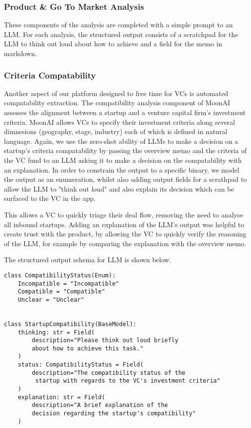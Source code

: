\documentclass[a4paper, oneside]{discothesis}
\begin{document}
\subsubsection{Product \& Go To Market Analysis}
These components of the analysis are completed with a simple prompt to an LLM. For each analysis, the structured output consists of a scratchpad for the LLM to think out loud about how to achieve and a field for the memo in markdown. 

\subsubsection{Criteria Compatability}
Another aspect of our platform designed to free time for VCs is automated compatability extraction. The compatibility analysis component of MoonAI assesses the alignment between a startup and a venture capital firm's investment criteria. MoonAI allows VCs to specify their investment criteria along several dimnesions (geography, stage, industry) each of which is defined in natural language. Again, we use the zero-shot ability of LLMs to make a decision on a startup's criteria compatability by passing the overview memo and the criteria of the VC fund to an LLM asking it to make a decision on the compatability with an explanation. In order to constrain the output to a specific binary, we model the output as an enumeration, whilst also adding output fields for a scrathpad to allow the LLM to "think out loud" and also explain its decision which can be surfaced to the VC in the app. 

This allows a VC to quickly triage their deal flow, removing the need to analyse all inbound startups. Adding an explanation of the LLM's output was helpful to create trust with the product, by allowing the VC to quickly verify the reasoning of the LLM, for example by comparing the explanation with the overview memo. 

The structured output schema for LLM is shown below.

\begin{verbatim}
class CompatibilityStatus(Enum):
    Incompatible = "Incompatible"
    Compatible = "Compatible"
    Unclear = "Unclear"


class StartupCompatibility(BaseModel):
    thinking: str = Field(
        description="Please think out loud briefly 
        about how to achieve this task."
    )
    status: CompatibilityStatus = Field(
        description="The compatibility status of the
         startup with regards to the VC's investment criteria"
    )
    explanation: str = Field(
        description="A brief explanation of the 
        decision regarding the startup's compatibility"
    )
\end{verbatim}
\end{document}
